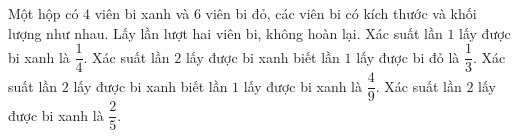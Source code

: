 \begin{ex}
Một hộp có $4$ viên bi xanh và $6$ viên bi đỏ, các viên bi có kích thước và khối lượng như nhau. Lấy lần lượt hai viên bi, không hoàn lại.
\choiceTF
{Xác suất lần $1$ lấy được bi xanh là $\dfrac14$.}
{Xác suất lần $2$ lấy được bi xanh biết lần $1$ lấy được bi đỏ là $\dfrac13$.}
{Xác suất lần $2$ lấy được bi xanh biết lần $1$ lấy được bi xanh là $\dfrac49$.}
{\True Xác suất lần $2$ lấy được bi xanh là $\dfrac25$.}
\end{ex}
